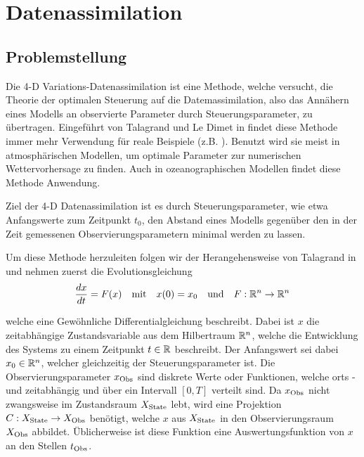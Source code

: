 \chapter{Datenassimilation}
\section{Problemstellung}
Die 4-D Variations-Datenassimilation ist eine Methode, welche versucht, die Theorie der optimalen Steuerung auf die Datemassimilation, also das Annähern eines Modells an observierte Parameter durch Steuerungsparameter, zu übertragen.
Eingeführt von Talagrand und Le Dimet in \cite{dimet1986variational} findet diese Methode immer mehr Verwendung für reale Beispiele (z.B. \cite{korotaev2008retrieving,elbern20004d,broquet2009application}). Benutzt wird sie meist in atmosphärischen Modellen, um optimale Parameter zur numerischen Wettervorhersage zu finden. Auch in ozeanographischen Modellen findet diese Methode Anwendung.

Ziel der 4-D Datenassimilation ist es durch Steuerungsparameter, wie etwa Anfangswerte zum Zeitpunkt $t_0$, den Abstand eines Modells gegenüber den in der Zeit gemessenen Observierungsparametern minimal werden zu lassen. 

Um diese Methode herzuleiten folgen wir der Herangehensweise von Talagrand in \cite{talagrand1987variational} und nehmen zuerst die Evolutionsgleichung
\begin{equation}
\label{eq:odemodel}
 \frac{dx}{dt} = F(x)\quad \text{mit} \quad x(0) = x_0 \quad \text{und}\quad F:\mathbb{R}^n\to \mathbb{R}^n
\end{equation}
  
welche eine Gewöhnliche Differentialgleichung beschreibt. Dabei ist $x$ die zeitabhängige Zustandsvariable aus dem Hilbertraum $\mathbb{R}^n$, welche die Entwicklung des Systems zu einem Zeitpunkt $t\in \mathbb{R}$ beschreibt. 
Der Anfangswert sei dabei $x_0 \in \mathbb{R}^n$, welcher gleichzeitig der Steuerungsparameter ist.
Die Observierungsparameter $x_{\text{Obs}}$ sind diskrete Werte oder Funktionen, welche orts - und zeitabhängig und über ein Intervall $[0,T]$ verteilt sind. Da $x_{\text{Obs}}$  nicht zwangsweise im Zustandsraum $X_{\text{State}}$ lebt, wird eine Projektion $C:X_{\text{State}}\to X_{\text{Obs}}$ benötigt, welche $x$ aus $X_{\text{State}}$ in den Observierungsraum $X_{\text{Obs}}$ abbildet. Üblicherweise ist diese Funktion eine Auswertungsfunktion von $x$ an den Stellen $t_{\text{Obs}}$.

